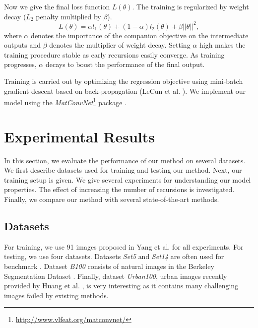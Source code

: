 \documentclass[10pt,twocolumn,letterpaper]{article}
\begin{document}
Now we give the final loss function $L(\theta)$. The training is regularized by weight decay ($L_2$ penalty multiplied by $\beta$). 
\begin{equation}
L(\theta)  =\alpha  l_1(\theta) + (1 - \alpha) l_2(\theta) + \beta ||\theta||^2,
\end{equation}
where $\alpha$ denotes the importance of the companion objective on the intermediate outputs and $\beta$ denotes the multiplier of weight decay.   Setting $\alpha$ high makes the training procedure stable as early recursions easily converge. As training progresses, $\alpha$ decays to boost the performance of the final output. 

Training is carried out by optimizing the regression objective using mini-batch gradient descent based on back-propagation (LeCun et al. \cite{lecun1998gradient}). We implement our model using the \textit{MatConvNet}\footnote{\url{ http://www.vlfeat.org/matconvnet/}} package \cite{arXiv:1412.4564}. 


\section{Experimental Results}
In this section, we evaluate the performance of our method on several datasets. We first describe datasets used for training and testing our method. Next, our training setup is given. We give several experiments for understanding our model properties. The effect of increasing the number of recursions is investigated. Finally, we compare our method with several state-of-the-art methods. 

\subsection{Datasets}
For training, we use 91 images proposed in Yang et al. \cite{yang2010image} for all experiments. For testing, we use four datasets. Datasets \textit{Set5} \cite{bevilacqua2012} and \textit{Set14} \cite{zeyde2012single} are often used for benchmark \cite{Timofte,Timofte2013,dong2014image}. Dataset \textit{B100}  consists of natural images in the Berkeley Segmentation Dataset \cite{Martin2001}. Finally, dataset \textit{Urban100}, urban images recently provided by Huang et al. \cite{Huang-CVPR-2015}, is very interesting as it contains many challenging images failed by existing methods.
\end{document}
